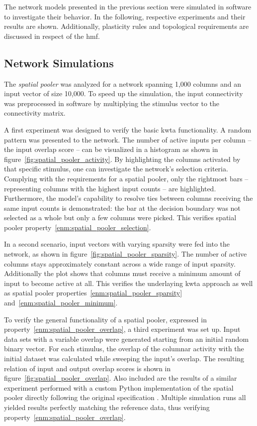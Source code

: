 The network models presented in the previous section were simulated in software to investigate their behavior. In the following, respective experiments and their results are shown. Additionally, plasticity rules and topological requirements are discussed in respect of the \gls{hmf}.

\subsection{Network Simulations}


The \emph{spatial pooler} was analyzed for a network spanning 1,000 columns and an input vector of size 10,000. To speed up the simulation, the input connectivity was preprocessed in software by multiplying the stimulus vector to the connectivity matrix.

A first experiment was designed to verify the basic \gls{kwta} functionality. A random pattern was presented to the network. The number of active inputs per column -- the input overlap score -- can be visualized in a histogram as shown in figure~\ref{fig:spatial_pooler_activity}. By highlighting the columns activated by that specific stimulus, one can investigate the network's selection criteria. Complying with the requirements for a spatial pooler, only the rightmost bars -- representing columns with the highest input counts -- are highlighted. Furthermore, the model's capability to resolve ties between columns receiving the same input counts is demonstrated: the bar at the decision boundary was not selected as a whole but only a few columns were picked. This verifies spatial pooler property~\ref{enm:spatial_pooler_selection}.

In a second scenario, input vectors with varying sparsity were fed into the network, as shown in figure~\ref{fig:spatial_pooler_sparsity}. The number of active columns stays approximately constant across a wide range of input sparsity. Additionally the plot shows that columns must receive a minimum amount of input to become active at all. This verifies the underlaying \gls{kwta} approach as well as spatial pooler properties~\ref{enm:spatial_pooler_sparsity} and~\ref{enm:spatial_pooler_minimum}.

To verify the general functionality of a spatial pooler, expressed in property~\ref{enm:spatial_pooler_overlap}, a third experiment was set up. Input data sets with a variable overlap were generated starting from an initial random binary vector. For each stimulus, the overlap of the columnar activity with the initial dataset was calculated while sweeping the input's overlap. The resulting relation of input and output overlap scores is shown in figure~\ref{fig:spatial_pooler_overlap}. Also included are the results of a similar experiment performed with a custom Python implementation of the spatial pooler directly following the original specification \citep{numenta2011htm}. Multiple simulation runs all yielded results perfectly matching the reference data, thus verifying property~\ref{enm:spatial_pooler_overlap}.

